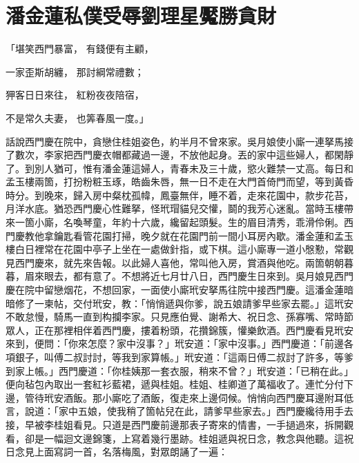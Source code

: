 %

\chapter{潘金蓮私僕受辱\KG 劉理星魘勝貪財}

\begin{showcontents}{}



「堪笑西門暴富，  有錢便有主顧，

一家歪斯胡纏，  那討綱常禮數；

狎客日日來往，  紅粉夜夜陪宿，

不是常久夫妻，  也筭春風一度。」

話說西門慶在院中，貪戀住桂姐姿色，約半月不曾來家。吳月娘使小廝一連拏馬接了數次，李家把西門慶衣帽都藏過一邊，不放他起身。丟的家中這些婦人，都閑靜了。到別人猶可，惟有潘金蓮這婦人，青春未及三十歲，慾火難禁一丈高。每日和孟玉樓兩箇，打扮粉粧玉琢，皓齒朱唇，無一日不走在大門首倚門而望，等到黃昏時分。到晚來，歸入房中粲枕孤幃，鳳臺無伴，睡不着，走來花園中，款步花苔，月洋水底。猶恐西門慶心性難拏，怪玳瑁貓兒交懽，鬬的我芳心迷亂。當時玉樓帶來一箇小廝，名喚琴童，年約十六歲，纔留起頭髮。生的眉目清秀，乖滑伶俐。西門慶教他拿鑰匙看管花園打掃，晚夕就在花園門前一間小耳房內歇。潘金蓮和孟玉樓白日裡常在花園中亭子上坐在一處做針指，或下棋。這小廝專一道小慇懃，常觀見西門慶來，就先來告報。以此婦人喜他，常叫他入房，賞酒與他吃。兩箇朝朝暮暮，眉來眼去，都有意了。不想將近七月廿八日，西門慶生日來到。吳月娘見西門慶在院中留戀烟花，不想回家，一面使小廝玳安拏馬往院中接西門慶。這潘金蓮暗暗修了一柬帖，交付玳安，教：「悄悄遞與你爹，說五娘請爹早些家去罷。」這玳安不敢怠慢，騎馬一直到构攔李家。只見應伯覺、謝希大、祝日念、孫寡嘴、常時節眾人，正在那裡相伴着西門慶，摟着粉頭，花攢錦簇，懽樂飲酒。西門慶看見玳安來到，便問：「你來怎麼？家中沒事？」玳安道：「家中沒事。」西門慶道：「前邊各項銀子，叫傅二叔討討，等我到家算帳。」玳安道：「這兩日傅二叔討了許多，等爹到家上帳。」西門慶道：「你桂姨那一套衣服，稍來不曾？」玳安道：「已稍在此。」便向毡包內取出一套紅衫藍裙，遞與桂姐。桂姐、桂卿道了萬福收了。連忙分付下邊，管待玳安酒飯。那小廝吃了酒飯，復走來上邊伺候。悄悄向西門慶耳邊附耳低言，說道：「家中五娘，使我稍了箇帖兒在此，請爹早些家去。」西門慶纔待用手去接，早被李桂姐看見。只道是西門慶前邊那表子寄來的情書，一手撾過來，拆開觀看，卻是一幅迴文邊錦箋，上寫着幾行墨跡。桂姐遞與祝日念，教念與他聽。這祝日念見上面寫詞一首，名落梅風，對眾朗誦了一遍：


\end{showcontents}
